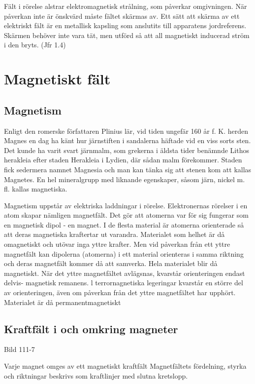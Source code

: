\documentclass[a4paper,twoside,twocolumn,openright]{book}
\begin{document}
Fält i rörelse alstrar elektromagnetisk strålning, som påverkar omgivningen. När
påverkan inte är önskvärd måste fältet skärmas av. Ett sätt att skärma av ett elektriskt
fält är en metallisk kapsling som anslutits till apparatens jordreferens. Skärmen behöver
inte vara tät, men utförd så att all magnetiskt inducerad ström i den bryts. (Jfr 1.4)

\cleardoublepage

\section{Magnetiskt fält}

\subsection{Magnetism}

Enligt den romerske författaren Plinius lär, vid tiden ungefär 160 år f. K. herden Magnes
en dag ha känt hur järnstiften i sandalerna häftade vid en viss sorts sten. Det kunde ha
varit svart järnmalm, som grekerna i äldsta tider benämnde Lithos herakleia efter staden
Herakleia i Lydien, där sådan malm förekommer. Staden fick sedermera namnet Magnesia och
man kan tänka sig att stenen kom att kallas Magnetes. En hel mineralgrupp med liknande
egenskaper, såsom järn, nickel m. fl. kallas magnetiska.

Magnetism uppstår av elektriska laddningar i rörelse. Elektronernas rörelser i en atom
skapar nämligen magnetfält. Det gör att atomerna var för sig fungerar som en magnetisk
dipol - en magnet. I de flesta material är atomerna orienterade så att deras magnetiska
kraftertar ut varandra. Materialet som helhet är då omagnetiskt och utövar inga yttre
krafter. Men vid påverkan från ett yttre magnetfält kan dipolerna (atomerna) i ett
material orienteras i samma riktning och deras magnetfält kommer då att
samverka. Hela materialet blir då magnetiskt. När det yttre magnetfältet avlägsnas,
kvarstår orienteringen endast delvis- magnetisk remanens. l terrornagnetiska legeringar
kvarstår en större del av orienteringen, även om påverkan från det yttre magnetfältet har
upphört. Materialet är då permanentmagnetiskt

\subsection{Kraftfält i och omkring magneter}

Bild 111-7

Varje magnet omges av ett magnetiskt kraftfält Magnetfältets fördelning, styrka och
riktningar beskrivs som kraftlinjer med slutna kretslopp.
\end{document}

